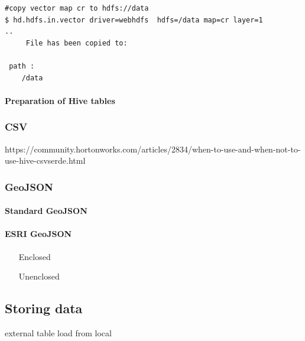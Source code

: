 \documentclass[a4paper,12pt,oneside]{report}
\begin{document}
\begin{footnotesize}
	\begin{lstlisting}[style=python]
#copy vector map cr to hdfs://data
$ hd.hdfs.in.vector driver=webhdfs  hdfs=/data map=cr layer=1
..
     File has been copied to: 

 path :
    /data
	\end{lstlisting}
\end{footnotesize}




\paragraph{Preparation of Hive tables}






	\subsubsection{CSV}
	https://community.hortonworks.com/articles/2834/when-to-use-and-when-not-to-use-hive-csvserde.html
	
	\subsubsection{GeoJSON}\label{json}	
	\paragraph{Standard GeoJSON}	
	\paragraph{ESRI GeoJSON}
	\begin{enumerate}
		\item[Enclosed]
		\item[Unenclosed]
	\end{enumerate}
	
	
	\subsection{Storing data}
	external table
	load from local
	
\end{document}
